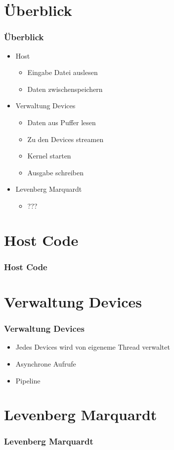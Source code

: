 \documentclass[ddcfooter]{tudbeamer}
\begin{document}
\section{Überblick}
\begin{frame}
    \frametitle*{Überblick}
	\begin{itemize}
	\item{Host}
	\begin{itemize}
		\item{Eingabe Datei auslesen}
		\item{Daten zwischenspeichern}
	\end{itemize}
	\item{Verwaltung Devices}
	\begin{itemize}
		\item{Daten aus Puffer lesen}
		\item{Zu den Devices streamen}
		\item{Kernel starten}
		\item{Ausgabe schreiben}
	\end{itemize}
	\item{Levenberg Marquardt}
	\begin{itemize}
		\item{???}
	\end{itemize}
	\end{itemize}
\end{frame}
\section{Host Code}
\begin{frame}
    \frametitle*{Host Code}
    
\end{frame}
\section{Verwaltung Devices}
\begin{frame}
    \frametitle*{Verwaltung Devices}
    \begin{itemize}
    	\item{Jedes Devices wird von eigeneme Thread verwaltet}
    	\item{Asynchrone Aufrufe}
    		\itemize
    			\item{Pipeline}
    		\enditemize
    \end{itemize}
\end{frame}
\section{Levenberg Marquardt}
\begin{frame}
    \frametitle*{Levenberg Marquardt}
    
\end{frame}
\end{document}
